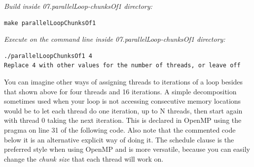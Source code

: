 \documentclass[letterpaper,10pt,openany,oneside]{sphinxmanual}
\begin{document}
\emph{Build inside 07.parallelLoop-chunksOf1 directory:}

\begin{Verbatim}[commandchars=\\\{\}]
make parallelLoopChunksOf1
\end{Verbatim}

\emph{Execute on the command line inside 07.parallelLoop-chunksOf1 directory:}

\begin{Verbatim}[commandchars=\\\{\}]
./parallelLoopChunksOf1 4
Replace 4 with other values for the number of threads, or leave off
\end{Verbatim}

You can imagine other ways of assigning threads to iterations of a loop besides that
shown above for four threads and 16 iterations.  A simple decomposition sometimes used
when your loop is not accessing consecutive memory locations would be to let each
thread do one iteration, up to N threads, then
start again with thread 0 taking the next iteration.  This is declared in OpenMP
using the pragma on line 31 of the following code.  Also note that the commented code
below it is an alternative explicit way of doing it.  The schedule clause is the preferred style
when using OpenMP and is more versatile, because you can easily change the \emph{chunk size}
that each thread will work on.
\end{document}
